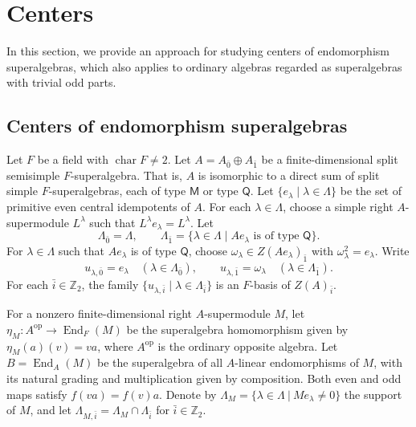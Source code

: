 \documentclass[11pt]{amsart}
\numberwithin{equation}{section}
\theoremstyle{plain}
\theoremstyle{definition}
\theoremstyle{remark}
\DeclareMathOperator{\End}{End}
\begin{document}
\section{Centers} \label{sec:center}
In this section, we provide an approach for studying centers of endomorphism superalgebras, which also applies to ordinary algebras regarded as superalgebras with trivial odd parts. 

\subsection{Centers of endomorphism superalgebras}
Let $F$ be a field with $\operatorname{char}F\neq2$. Let $A=A_{\bar{0}}\oplus A_{\bar{1}}$ be a finite-dimensional split semisimple $F$-superalgebra. That is, $A$ is isomorphic to a direct sum of split simple $F$-superalgebras, each of type $\mathsf{M}$ or type $\mathsf{Q}$.
Let $\{e_\lambda\mid\lambda\in\Lambda\}$ be the set of
primitive even central idempotents of $A$.
For each $\lambda\in\Lambda$, choose a simple right
$A$-supermodule $L^\lambda$ such that
$L^\lambda e_\lambda=L^\lambda$.
Let
$$
\Lambda_{\bar0}=\Lambda,
\qquad
\Lambda_{\bar1}
=\{\lambda\in\Lambda\mid Ae_\lambda\text{ is of type $\mathsf{Q}$}\}.
$$
For $\lambda\in \Lambda$ such that $Ae_\lambda$ is of type $\mathsf{Q}$, choose $\omega_\lambda\in Z(Ae_\lambda)_{\bar 1}$ with $\omega_\lambda^2=e_\lambda$.
Write
$$
u_{\lambda,\bar0}=e_\lambda
\quad(\lambda\in\Lambda_{\bar0}),
\qquad
u_{\lambda,\bar1}=\omega_\lambda
\quad(\lambda\in\Lambda_{\bar1}).
$$
For each $\bar i\in\mathbb Z_2$, the family
$\{u_{\lambda,\bar i}\mid\lambda\in\Lambda_{\bar i}\}$
is an $F$-basis of $Z(A)_{\bar i}$.

For a nonzero finite-dimensional right $A$-supermodule $M$, let
$\eta_M:A^{\operatorname{op}}\to\End_F(M)$
be the superalgebra homomorphism given by $\eta_M(a)(v)=va$, where $A^{\operatorname{op}}$ is the
ordinary opposite algebra. Let $B=\End_A(M)$ be the
superalgebra of all $A$-linear endomorphisms of $M$, with its natural
grading and multiplication given by composition. Both even and
odd maps satisfy $f(va)=f(v)a$. Denote by
$\Lambda_M=\{\lambda\in\Lambda~|~Me_\lambda\neq0\}$ the support of $M$, and let $\Lambda_{M,\bar i}=\Lambda_M\cap\Lambda_{\bar i}$ for $\bar i\in \mathbb Z_2$.
\end{document}
